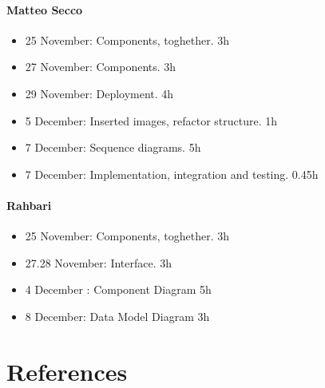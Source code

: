 \documentclass{article}
\begin{document}
	\paragraph{Matteo Secco}
		\begin{itemize}
			\item 25 November: Components, toghether. 3h
			\item 27 November: Components. 3h
			\item 29 November: Deployment. 4h
			\item 5 December: Inserted images, refactor structure. 1h
			\item 7 December: Sequence diagrams. 5h
			\item 7 December: Implementation, integration and testing. 0.45h
		\end{itemize}
	\paragraph{Rahbari}
		\begin{itemize}
			\item 25 November: Components, toghether. 3h
			\item 27.28 November: Interface. 3h
			\item 4 December : Component Diagram 5h
			\item 8 December: Data Model Diagram 3h
		\end{itemize}
\section{References}
\end{document}
